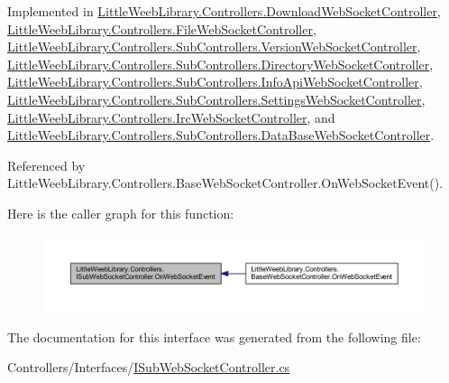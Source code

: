 Implemented in \mbox{\hyperlink{class_little_weeb_library_1_1_controllers_1_1_download_web_socket_controller_a9e5e421ed57b8b2a294e17d93d027c53}{Little\+Weeb\+Library.\+Controllers.\+Download\+Web\+Socket\+Controller}}, \mbox{\hyperlink{class_little_weeb_library_1_1_controllers_1_1_file_web_socket_controller_a9ecdec41f15ac23a56c402ff2c554a08}{Little\+Weeb\+Library.\+Controllers.\+File\+Web\+Socket\+Controller}}, \mbox{\hyperlink{class_little_weeb_library_1_1_controllers_1_1_sub_controllers_1_1_version_web_socket_controller_aecbfb94508db51693b11ea8dba9cf7e9}{Little\+Weeb\+Library.\+Controllers.\+Sub\+Controllers.\+Version\+Web\+Socket\+Controller}}, \mbox{\hyperlink{class_little_weeb_library_1_1_controllers_1_1_sub_controllers_1_1_directory_web_socket_controller_a2db42c05c620f5658a5b6e473581f84c}{Little\+Weeb\+Library.\+Controllers.\+Sub\+Controllers.\+Directory\+Web\+Socket\+Controller}}, \mbox{\hyperlink{class_little_weeb_library_1_1_controllers_1_1_sub_controllers_1_1_info_api_web_socket_controller_ad620537574b819085ff8eb394add2912}{Little\+Weeb\+Library.\+Controllers.\+Sub\+Controllers.\+Info\+Api\+Web\+Socket\+Controller}}, \mbox{\hyperlink{class_little_weeb_library_1_1_controllers_1_1_sub_controllers_1_1_settings_web_socket_controller_a39b333aee248388fd295a8511486c76e}{Little\+Weeb\+Library.\+Controllers.\+Sub\+Controllers.\+Settings\+Web\+Socket\+Controller}}, \mbox{\hyperlink{class_little_weeb_library_1_1_controllers_1_1_irc_web_socket_controller_a5ea966dddf1e0a082dd5ec28f6ace3ab}{Little\+Weeb\+Library.\+Controllers.\+Irc\+Web\+Socket\+Controller}}, and \mbox{\hyperlink{class_little_weeb_library_1_1_controllers_1_1_sub_controllers_1_1_data_base_web_socket_controller_a655abc0c42c54c9ff3572e4b4271fa3b}{Little\+Weeb\+Library.\+Controllers.\+Sub\+Controllers.\+Data\+Base\+Web\+Socket\+Controller}}.



Referenced by Little\+Weeb\+Library.\+Controllers.\+Base\+Web\+Socket\+Controller.\+On\+Web\+Socket\+Event().

Here is the caller graph for this function\+:\nopagebreak
\begin{figure}[H]
\begin{center}
\leavevmode
\includegraphics[width=350pt]{interface_little_weeb_library_1_1_controllers_1_1_i_sub_web_socket_controller_adcb26b7b397d6a67ccbf114008c29985_icgraph}
\end{center}
\end{figure}


The documentation for this interface was generated from the following file\+:\begin{DoxyCompactItemize}
\item 
Controllers/\+Interfaces/\mbox{\hyperlink{_i_sub_web_socket_controller_8cs}{I\+Sub\+Web\+Socket\+Controller.\+cs}}\end{DoxyCompactItemize}
